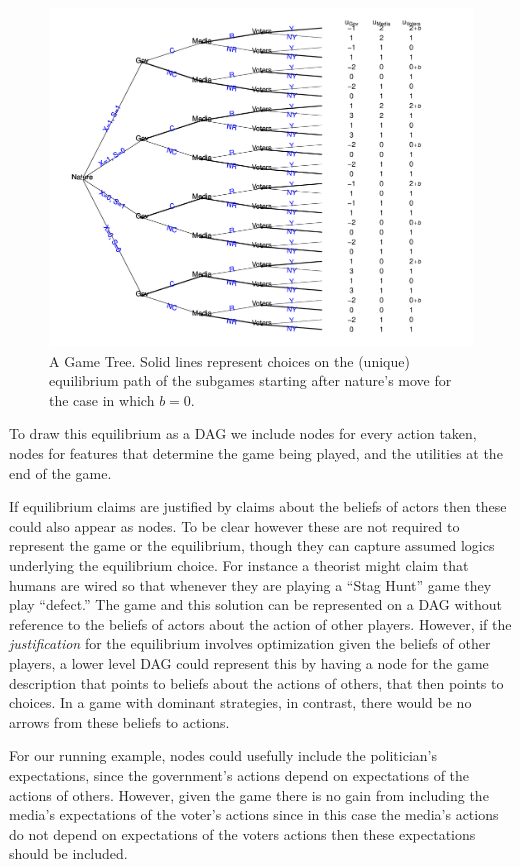 \documentclass[
  12pt,
]{book}
\begin{document}
\begin{figure}
\centering
\includegraphics{ii_files/figure-latex/tree-1.pdf}
\caption{\label{fig:tree}\label{fig:tree} A Game Tree. Solid lines represent choices on the (unique) equilibrium path of the subgames starting after nature's move for the case in which \(b=0\).}
\end{figure}

To draw this equilibrium as a DAG we include nodes for every action taken, nodes for features that determine the game being played, and the utilities at the end of the game.

If equilibrium claims are justified by claims about the beliefs of actors then these could also appear as nodes. To be clear however these are not required to represent the game or the equilibrium, though they can capture assumed logics underlying the equilibrium choice. For instance a theorist might claim that humans are wired so that whenever they are playing a ``Stag Hunt'' game they play ``defect.'' The game and this solution can be represented on a DAG without reference to the beliefs of actors about the action of other players. However, if the \emph{justification} for the equilibrium involves optimization given the beliefs of other players, a lower level DAG could represent this by having a node for the game description that points to beliefs about the actions of others, that then points to choices. In a game with dominant strategies, in contrast, there would be no arrows from these beliefs to actions.

For our running example, nodes could usefully include the politician's expectations, since the government's actions depend on expectations of the actions of others. However, given the game there is no gain from including the media's expectations of the voter's actions since in this case the media's actions do not depend on expectations of the voters actions then these expectations should be included.
\end{document}
